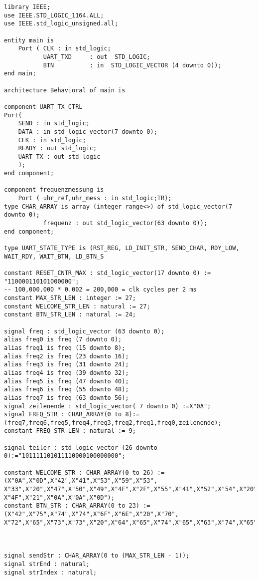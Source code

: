 \documentclass{article}
\begin{document}
\begin{verbatim}
library IEEE;
use IEEE.STD_LOGIC_1164.ALL;
use IEEE.std_logic_unsigned.all;

entity main is
    Port ( CLK : in std_logic;
           UART_TXD 	: out  STD_LOGIC;
           BTN 			: in  STD_LOGIC_VECTOR (4 downto 0));
end main;

architecture Behavioral of main is

component UART_TX_CTRL
Port(
	SEND : in std_logic;
	DATA : in std_logic_vector(7 downto 0);
	CLK : in std_logic;          
	READY : out std_logic;
	UART_TX : out std_logic
	);
end component;

component frequenzmessung is
    Port ( uhr_ref,uhr_mess : in std_logic;TR);
type CHAR_ARRAY is array (integer range<>) of std_logic_vector(7 downto 0);
           frequenz : out std_logic_vector(63 downto 0));
end component;

type UART_STATE_TYPE is (RST_REG, LD_INIT_STR, SEND_CHAR, RDY_LOW, WAIT_RDY, WAIT_BTN, LD_BTN_S

constant RESET_CNTR_MAX : std_logic_vector(17 downto 0) := "110000110101000000";
-- 100,000,000 * 0.002 = 200,000 = clk cycles per 2 ms
constant MAX_STR_LEN : integer := 27;
constant WELCOME_STR_LEN : natural := 27;
constant BTN_STR_LEN : natural := 24;

signal freq : std_logic_vector (63 downto 0);
alias freq0 is freq (7 downto 0);
alias freq1 is freq (15 downto 8);
alias freq2 is freq (23 downto 16);
alias freq3 is freq (31 downto 24);
alias freq4 is freq (39 downto 32);
alias freq5 is freq (47 downto 40);
alias freq6 is freq (55 downto 48);
alias freq7 is freq (63 downto 56);
signal zeilenende : std_logic_vector( 7 downto 0) :=X"0A";
signal FREQ_STR : CHAR_ARRAY(0 to 8):=(freq7,freq6,freq5,freq4,freq3,freq2,freq1,freq0,zeilenende);
constant FREQ_STR_LEN : natural := 9;

signal teiler : std_logic_vector (26 downto 0):="101111101011110000100000000";

constant WELCOME_STR : CHAR_ARRAY(0 to 26) := (X"0A",X"0D",X"42",X"41",X"53",X"59",X"53",
X"33",X"20",X"47",X"50",X"49",X"4F",X"2F",X"55",X"41",X"52",X"54",X"20",X"44",X"45",X"4D",
X"4F",X"21",X"0A",X"0A",X"0D");
constant BTN_STR : CHAR_ARRAY(0 to 23) := (X"42",X"75",X"74",X"74",X"6F",X"6E",X"20",X"70",
X"72",X"65",X"73",X"73",X"20",X"64",X"65",X"74",X"65",X"63",X"74",X"65",X"64",X"21",X"0A",X"0D");



signal sendStr : CHAR_ARRAY(0 to (MAX_STR_LEN - 1));
signal strEnd : natural;
signal strIndex : natural;


\end{verbatim}
\end{document}
